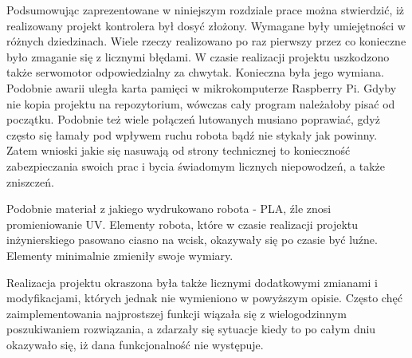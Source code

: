 Podsumowując zaprezentowane w niniejszym rozdziale prace można stwierdzić, iż realizowany projekt kontrolera był dosyć złożony. Wymagane były umiejętności w różnych dziedzinach. Wiele rzeczy realizowano po raz pierwszy przez co konieczne było zmaganie się z licznymi błędami. W czasie realizacji projektu uszkodzono także serwomotor odpowiedzialny za chwytak. Konieczna była jego wymiana. Podobnie awarii uległa karta pamięci w mikrokomputerze Raspberry Pi. Gdyby nie kopia projektu na repozytorium, wówczas cały program należałoby pisać od początku. Podobnie też wiele połączeń lutowanych musiano poprawiać, gdyż często się łamały pod wpływem ruchu robota bądź nie stykały jak powinny. Zatem wnioski jakie się nasuwają od strony technicznej to konieczność zabezpieczania swoich prac i bycia świadomym licznych niepowodzeń, a także zniszczeń.

Podobnie materiał z jakiego wydrukowano robota - PLA, źle znosi promieniowanie UV. Elementy robota, które w czasie realizacji projektu inżynierskiego pasowano ciasno na wcisk, okazywały się po czasie być luźne. Elementy minimalnie zmieniły swoje wymiary.

Realizacja projektu okraszona była także licznymi dodatkowymi zmianami i modyfikacjami, których jednak nie wymieniono w powyższym opisie. Często chęć zaimplementowania najprostszej funkcji wiązała się z wielogodzinnym poszukiwaniem rozwiązania, a zdarzały się sytuacje kiedy to po całym dniu okazywało się, iż dana funkcjonalność nie występuje.  

